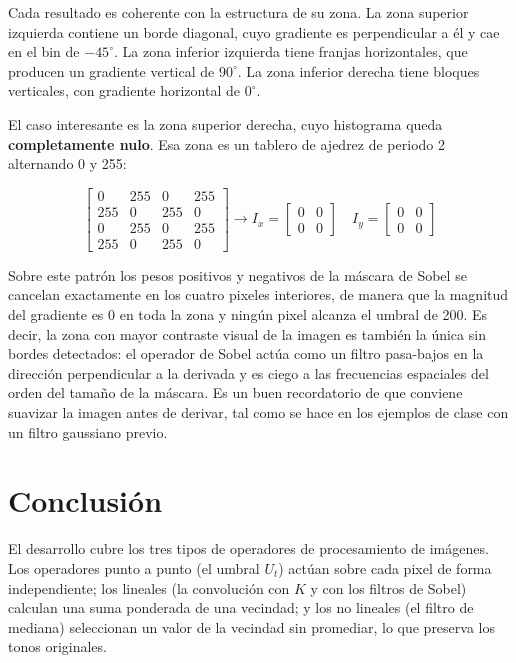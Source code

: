 \documentclass[12pt, a4paper]{article}
\begin{document}
Cada resultado es coherente con la estructura de su zona. La zona superior izquierda contiene un borde diagonal, cuyo gradiente es perpendicular a él y cae en el bin de $-45^\circ$. La zona inferior izquierda tiene franjas horizontales, que producen un gradiente vertical de $90^\circ$. La zona inferior derecha tiene bloques verticales, con gradiente horizontal de $0^\circ$.

El caso interesante es la zona superior derecha, cuyo histograma queda \textbf{completamente nulo}. Esa zona es un tablero de ajedrez de periodo 2 alternando 0 y 255:

\[
\begin{bmatrix}
0 & 255 & 0 & 255 \\
255 & 0 & 255 & 0 \\
0 & 255 & 0 & 255 \\
255 & 0 & 255 & 0
\end{bmatrix}
\longrightarrow
I_x =
\begin{bmatrix}
0 & 0 \\
0 & 0
\end{bmatrix}
\quad
I_y =
\begin{bmatrix}
0 & 0 \\
0 & 0
\end{bmatrix}
\]

Sobre este patrón los pesos positivos y negativos de la máscara de Sobel se cancelan exactamente en los cuatro pixeles interiores, de manera que la magnitud del gradiente es 0 en toda la zona y ningún pixel alcanza el umbral de 200. Es decir, la zona con mayor contraste visual de la imagen es también la única sin bordes detectados: el operador de Sobel actúa como un filtro pasa-bajos en la dirección perpendicular a la derivada y es ciego a las frecuencias espaciales del orden del tamaño de la máscara. Es un buen recordatorio de que conviene suavizar la imagen antes de derivar, tal como se hace en los ejemplos de clase con un filtro gaussiano previo.

\section{Conclusión}

El desarrollo cubre los tres tipos de operadores de procesamiento de imágenes. Los operadores punto a punto (el umbral $U_t$) actúan sobre cada pixel de forma independiente; los lineales (la convolución con $K$ y con los filtros de Sobel) calculan una suma ponderada de una vecindad; y los no lineales (el filtro de mediana) seleccionan un valor de la vecindad sin promediar, lo que preserva los tonos originales.
\end{document}

